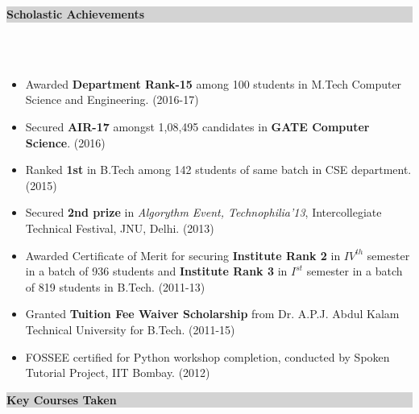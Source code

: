 \documentclass[a4paper,10pt]{article}
\newcommand{\sectsep}{-0.3cm}
\newcommand{\lsep}{-0.5cm}
\newcommand{\hsep}{-0.6cm}
\newcommand{\resheading}[1]{{\small \colorbox{lightgray}{\begin{minipage}{0.975\textwidth}{\textbf{#1 \vphantom{p\^{E}}}}\end{minipage}}}}
\begin{document}
\resheading{\textbf{\large Scholastic Achievements}} \\[\lsep] \\[-0.4cm]
\begin{itemize}
\item \noindent Awarded \textbf{Department Rank-15} among 100 students  in M.Tech Computer Science and Engineering.  \hfill (2016-17) \\[\hsep]

\item \noindent Secured \textbf{AIR-17} amongst 1,08,495 candidates in \textbf{GATE Computer Science}.  \hfill (2016) \\[\hsep]

\item \noindent Ranked \textbf{1st} in B.Tech among 142 students of same batch in CSE department. \hfill (2015) \\[\hsep]

\item \noindent Secured \textbf{2nd prize} in \textit{Algorythm Event, Technophilia'13}, Intercollegiate Technical Festival, JNU, Delhi.  \hfill (2013) \\[\hsep]

\item \noindent Awarded Certificate of Merit for securing \textbf{Institute Rank 2} in $IV^{th}$ semester in a batch of 936 students and \textbf{Institute Rank 3} in $I^{st}$ semester in a batch of 819 students in B.Tech.	\hfill (2011-13) \\[\hsep]

\item \noindent Granted \textbf{Tuition Fee Waiver Scholarship} from Dr. A.P.J. Abdul Kalam Technical University for B.Tech.	\hfill (2011-15)\\[\hsep]
\item FOSSEE certified for Python workshop completion, conducted by Spoken Tutorial Project, IIT Bombay. \hfill (2012)\\[\sectsep]
\end{itemize}




\resheading{\textbf{\large Key Courses Taken}}\\[\hsep]
\\[0.1cm]
\end{document}
